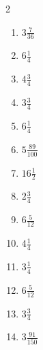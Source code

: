 \documentclass[12pt]{article}
\begin{document}
\begin{multicols}{2}
\begin{enumerate}
\item $ 3 \frac{7}{36} $
\item $ 6 \frac{1}{4} $
\item $ 4 \frac{3}{4} $
\item $ 3 \frac{3}{4} $
\item $ 6 \frac{1}{4} $
\item $ 5 \frac{89}{100} $
\item $ 16 \frac{1}{2} $
\item $ 2 \frac{3}{4} $
\item $ 6 \frac{5}{12} $
\item $ 4 \frac{1}{4} $
\item $ 3 \frac{1}{4} $
\item $ 6 \frac{5}{12} $
\item $ 3 \frac{3}{4} $
\item $ 3 \frac{91}{150} $
\end{enumerate}\end{multicols}\newpage
\end{document}
